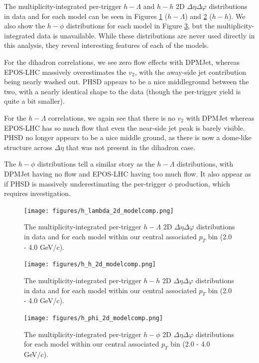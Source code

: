 The multiplicity-integrated per-trigger $h-\Lambda$ and $h-h$ 2D $\Delta\eta\Delta\varphi$ distributions in data and for each model can be seen in Figures \ref{h_lambda_2d_model} ($h-\Lambda$) and \ref{h_h_2d_model} ($h-h$). We also show the $h-\phi$ distributions for each model in Figure \ref{h_phi_2d_model}, but the multiplicity-integrated data is unavailable. While these distributions are never used directly in this analysis, they reveal interesting features of each of the models. 

For the dihadron correlations, we see zero flow effects with DPMJet, whereas EPOS-LHC massively overestimates the $v_{2}$, with the away-side jet contribution being nearly washed out. PHSD appears to be a nice middleground between the two, with a nearly identical shape to the data (though the per-trigger yield is quite a bit smaller).

For the $h-\Lambda$ correlations, we again see that there is no $v_{2}$ with DPMJet whereas EPOS-LHC has so much flow that even the near-side jet peak is barely visible. PHSD no longer appears to be a nice middle ground, as there is now a dome-like structure across $\Delta\eta$ that was not present in the dihadron case. 

The $h-\phi$ distributions tell a similar story as the $h-\Lambda$ distributions, with DPMJet having no flow and EPOS-LHC having too much flow. It also appear as if PHSD is massively underestimating the per-trigger $\phi$ production, which requires investigation.


\begin{figure}[ht]
\centering
\texttt{[image: figures/h\_lambda\_2d\_modelcomp.png]}
\caption{The multiplicity-integrated per-trigger $h-\Lambda$ 2D $\Delta\eta\Delta\varphi$ distributions in data and for each model within our central associated $p_{T}$ bin (2.0 - 4.0 GeV/c).}
\label{h_lambda_2d_model}
\end{figure}

\begin{figure}[ht]
\centering
\texttt{[image: figures/h\_h\_2d\_modelcomp.png]}
\caption{The multiplicity-integrated per-trigger $h-h$ 2D $\Delta\eta\Delta\varphi$ distributions in data and for each model within our central associated $p_{T}$ bin (2.0 - 4.0 GeV/c).}
\label{h_h_2d_model}
\end{figure}
\clearpage

\begin{figure}[ht]
\centering
\texttt{[image: figures/h\_phi\_2d\_modelcomp.png]}
\caption{The multiplicity-integrated per-trigger $h-\phi$ 2D $\Delta\eta\Delta\varphi$ distributions for each model within our central associated $p_{T}$ bin (2.0 - 4.0 GeV/c).}
\label{h_phi_2d_model}
\end{figure}

